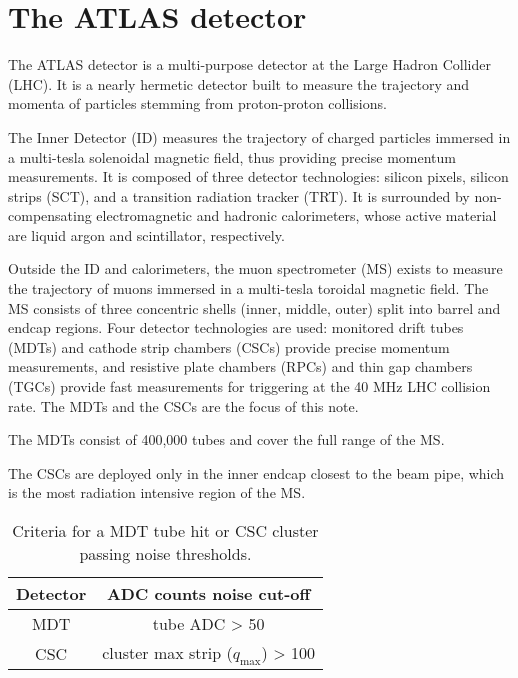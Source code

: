 \section{The ATLAS detector}
\label{sec:detector}

The ATLAS detector is a multi-purpose detector at the Large Hadron Collider (LHC). It is a nearly hermetic detector built to measure the trajectory and momenta of particles stemming from proton-proton collisions. 

The Inner Detector (ID) measures the trajectory of charged particles immersed in a multi-tesla solenoidal magnetic field, thus providing precise momentum measurements. It is composed of three detector technologies: silicon pixels, silicon strips (SCT), and a transition radiation tracker (TRT). It is surrounded by non-compensating electromagnetic and hadronic calorimeters, whose active material are liquid argon and scintillator, respectively.

Outside the ID and calorimeters, the muon spectrometer (MS) exists to measure the trajectory of muons immersed in a multi-tesla toroidal magnetic field. The MS consists of three concentric shells (inner, middle, outer) split into barrel and endcap regions. Four detector technologies are used: monitored drift tubes (MDTs) and cathode strip chambers (CSCs) provide precise momentum measurements, and resistive plate chambers (RPCs) and thin gap chambers (TGCs) provide fast measurements for triggering at the 40 MHz LHC collision rate. The MDTs and the CSCs are the focus of this note.

The MDTs consist of 400,000 tubes and cover the full range of the MS. 

The CSCs are deployed only in the inner endcap closest to the beam pipe, which is the most radiation intensive region of the MS. 

\begin{table}
  \begin{center}
    \begin{tabular}{ c | c }
      Detector & ADC counts noise cut-off \\
      \hline
      MDT      & tube ADC > 50 \\
      CSC      & cluster max strip ($q_\text{max}$) > 100 \\
    \end{tabular}
    \caption{Criteria for a MDT tube hit or CSC cluster passing noise thresholds.}
    \label{tab:detector-adc}
  \end{center}
\end{table}



